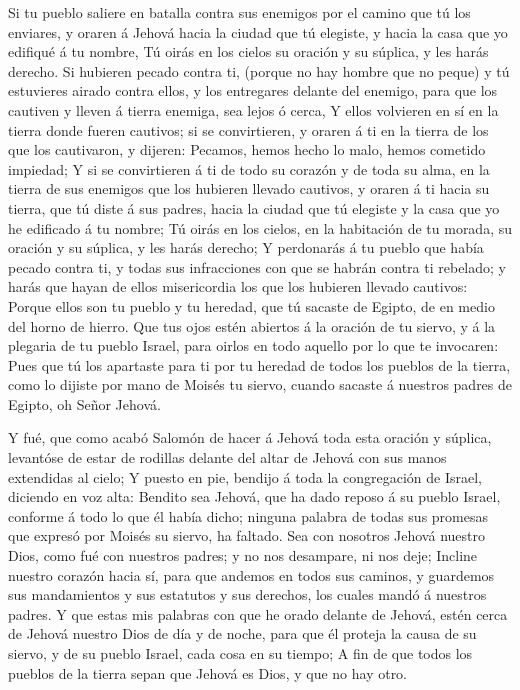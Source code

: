  Si tu pueblo saliere en batalla contra sus enemigos por el
camino que tú los enviares, y oraren á Jehová hacia la ciudad que tú
elegiste, y hacia la casa que yo edifiqué á tu nombre,  Tú
oirás en los cielos su oración y su súplica, y les harás derecho.
 Si hubieren pecado contra ti, (porque no hay hombre que no
peque) y tú estuvieres airado contra ellos, y los entregares delante del
enemigo, para que los cautiven y lleven á tierra enemiga, sea lejos ó
cerca,  Y ellos volvieren en sí en la tierra donde fueren
cautivos; si se convirtieren, y oraren á ti en la tierra de los que los
cautivaron, y dijeren: Pecamos, hemos hecho lo malo, hemos cometido
impiedad;  Y si se convirtieren á ti de todo su corazón y
de toda su alma, en la tierra de sus enemigos que los hubieren llevado
cautivos, y oraren á ti hacia su tierra, que tú diste á sus padres,
hacia la ciudad que tú elegiste y la casa que yo he edificado á tu
nombre;  Tú oirás en los cielos, en la habitación de tu
morada, su oración y su súplica, y les harás derecho;  Y
perdonarás á tu pueblo que había pecado contra ti, y todas sus
infracciones con que se habrán contra ti rebelado; y harás que hayan de
ellos misericordia los que los hubieren llevado cautivos: 
Porque ellos son tu pueblo y tu heredad, que tú sacaste de Egipto, de en
medio del horno de hierro.  Que tus ojos estén abiertos á
la oración de tu siervo, y á la plegaria de tu pueblo Israel, para
oirlos en todo aquello por lo que te invocaren:  Pues que
tú los apartaste para ti por tu heredad de todos los pueblos de la
tierra, como lo dijiste por mano de Moisés tu siervo, cuando sacaste á
nuestros padres de Egipto, oh Señor Jehová.

 Y fué, que como acabó Salomón de hacer á Jehová toda esta
oración y súplica, levantóse de estar de rodillas delante del altar de
Jehová con sus manos extendidas al cielo;  Y puesto en pie,
bendijo á toda la congregación de Israel, diciendo en voz alta:
 Bendito sea Jehová, que ha dado reposo á su pueblo Israel,
conforme á todo lo que él había dicho; ninguna palabra de todas sus
promesas que expresó por Moisés su siervo, ha faltado.  Sea
con nosotros Jehová nuestro Dios, como fué con nuestros padres; y no nos
desampare, ni nos deje;  Incline nuestro corazón hacia sí,
para que andemos en todos sus caminos, y guardemos sus mandamientos y
sus estatutos y sus derechos, los cuales mandó á nuestros padres.
 Y que estas mis palabras con que he orado delante de
Jehová, estén cerca de Jehová nuestro Dios de día y de noche, para que
él proteja la causa de su siervo, y de su pueblo Israel, cada cosa en su
tiempo;  A fin de que todos los pueblos de la tierra sepan
que Jehová es Dios, y que no hay otro.

